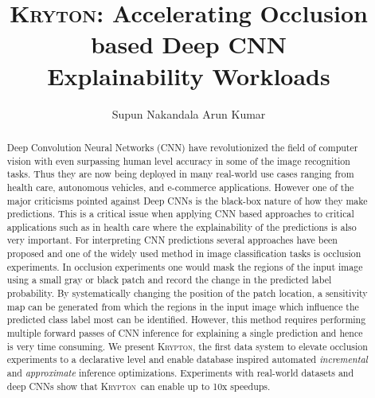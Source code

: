 \documentclass[10pt, sigconf]{acmart}
\newcommand{\system}{\textsc{Krypton}}
\begin{document}
\title{\textsc{Kryton}: Accelerating Occlusion based Deep CNN\\ Explainability Workloads}

\author{Supun Nakandala \hspace{7mm} Arun Kumar}


\begin{abstract}
Deep Convolution Neural Networks (CNN) have revolutionized the field of computer vision with even surpassing human level accuracy in some of the image recognition tasks. Thus they are now being deployed in many real-world use cases ranging from health care, autonomous vehicles, and e-commerce applications. However one of the major criticisms pointed against Deep CNNs is the black-box nature of how they make predictions. This is a critical issue when applying CNN based approaches to critical applications such as in health care where the explainability of the predictions is also very important. For interpreting CNN predictions several approaches have been proposed and one of the widely used method in image classification tasks is occlusion experiments. In occlusion experiments one would mask the regions of the input image using a small gray or black patch and record the change in the predicted label probability. By systematically changing the position of the patch location, a sensitivity map can be generated from which the regions in the input image which influence the predicted class label most can be identified. However, this method requires performing multiple forward passes of CNN inference for explaining a single prediction and hence is very time consuming.
We present \system, the first data system to elevate occlusion experiments to a declarative level and enable database inspired automated \textit{incremental} and \textit{approximate} inference optimizations. Experiments with real-world datasets and deep CNNs show that \system~can enable up to 10x speedups.
\end{abstract}

\maketitle















\end{document}
